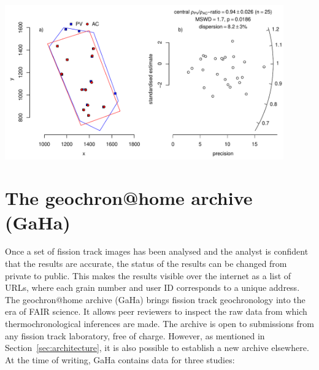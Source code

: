 \documentclass[gchron, manuscript]{copernicus}
\begin{document}
{ \centering \includegraphics[width=12cm]{AvP.pdf}
  \label{fig:AvP}
}%

\section{The geochron@home archive (GaHa)}\label{sec:GaHa}

Once a set of fission track images has been analysed and the analyst
is confident that the results are accurate, the status of the results
can be changed from private to public. This makes the results visible
over the internet as a list of URLs, where each grain number and user
ID corresponds to a unique address. The geochron@home archive
(GaHa) brings fission track geochronology into the era of FAIR
science. It allows peer reviewers to inspect the raw data from which
thermochronological inferences are made. The archive is open to
submissions from any fission track laboratory, free of charge.
However, as mentioned in Section~\ref{sec:architecture}, it is also
possible to establish a new archive elsewhere. At the time of writing,
GaHa contains data for three studies:
\end{document}
